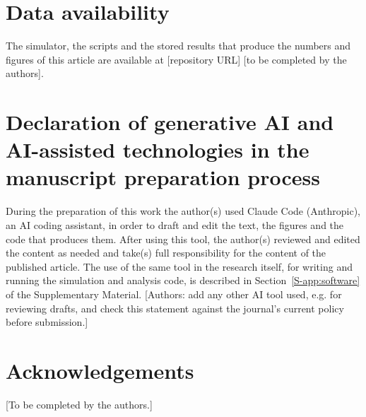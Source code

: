 \documentclass[preprint,12pt]{elsarticle}
\begin{document}
\section*{Data availability}
The simulator, the scripts and the stored results that produce the numbers and figures of this article are available at [repository URL] [to be completed by the authors].

\section*{Declaration of generative AI and AI-assisted technologies in the manuscript preparation process}
During the preparation of this work the author(s) used Claude Code (Anthropic), an AI coding assistant, in order to draft and edit the text, the figures and the code that produces them. After using this tool, the author(s) reviewed and edited the content as needed and take(s) full responsibility for the content of the published article. The use of the same tool in the research itself, for writing and running the simulation and analysis code, is described in Section~\ref{S-app:software} of the Supplementary Material. [Authors: add any other AI tool used, e.g. for reviewing drafts, and check this statement against the journal's current policy before submission.]

\section*{Acknowledgements}
[To be completed by the authors.]




\end{document}
